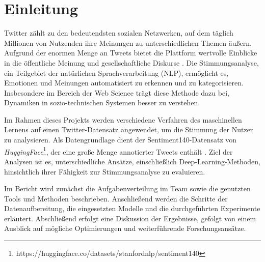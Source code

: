 \section{Einleitung}

Twitter zählt zu den bedeutendsten sozialen Netzwerken, auf dem täglich Millionen von Nutzenden ihre Meinungen zu unterschiedlichen Themen äußern.
Aufgrund der enormen Menge an Tweets bietet die Plattform wertvolle Einblicke in die öffentliche Meinung und gesellschaftliche Diskurse \cite{pak2010twitter}.
Die Stimmungsanalyse, ein Teilgebiet der natürlichen Sprachverarbeitung (NLP), ermöglicht es, Emotionen und Meinungen automatisiert zu erkennen und zu kategorisieren.
Insbesondere im Bereich der Web Science trägt diese Methode dazu bei, Dynamiken in sozio-technischen Systemen besser zu verstehen.

Im Rahmen dieses Projekts werden verschiedene Verfahren des maschinellen Lernens auf einen Twitter-Datensatz angewendet, um die Stimmung der Nutzer zu analysieren.
Als Datengrundlage dient der \glqq Sentiment140\grqq{}-Datensatz von \textit{HuggingFace}\footnote{https://huggingface.co/datasets/stanfordnlp/sentiment140}, der eine große Menge annotierter Tweets enthält \cite{go2009twitter}.
Ziel der Analysen ist es, unterschiedliche Ansätze, einschließlich Deep-Learning-Methoden, hinsichtlich ihrer Fähigkeit zur Stimmungsanalyse zu evaluieren.

Im Bericht wird zunächst die Aufgabenverteilung im Team sowie die genutzten Tools und Methoden beschrieben.
Anschließend werden die Schritte der Datenaufbereitung, die eingesetzten Modelle und die durchgeführten Experimente erläutert.
Abschließend erfolgt eine Diskussion der Ergebnisse, gefolgt von einem Ausblick auf mögliche Optimierungen und weiterführende Forschungsansätze.
